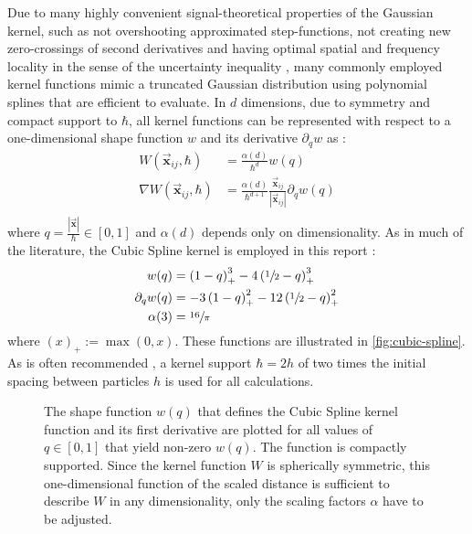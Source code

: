 \documentclass[oneside, a4paper]{book}
\newcommand\abs[1]{\left|#1\right|}
\newcommand\vek[1]{\vec{\bm{#1}}}
\newcommand\br[1]{\left(#1\right)}
\begin{document}
    Due to many highly convenient signal-theoretical properties of the Gaussian kernel, such as not overshooting approximated step-functions, not creating new zero-crossings of second derivatives and having optimal spatial and frequency locality in the sense of the uncertainty inequality \autocite{gauss-optimal}, many commonly employed kernel functions mimic a truncated Gaussian distribution using polynomial splines that are efficient to evaluate. In $d$ dimensions, due to symmetry and compact support to $\hbar$, all kernel functions can be represented with respect to a one-dimensional shape function $w$ and its derivative $\partial_q w$ as \autocite{band-phd}:
    \begin{align}\label{eq:kernel-definition}
      W(\vek{x}_{ij}, \hbar) &= \frac{\alpha(d)}{\hbar^d}w\br{q}\\
      \nabla W(\vek{x}_{ij}, \hbar) &= \frac{\alpha(d)}{\hbar^{d+1}}\frac{\vek{x}_{ij}}{\abs{\vek{x}_{ij}}} \partial_q w\br{q}\\
    \end{align}
    where $q = \frac{\abs{\vek{x}}}{\hbar} \in \left[0,1\right]$ and $\alpha(d)$ depends only on dimensionality. As in much of the literature, the Cubic Spline kernel is employed in this report \autocite{band-phd}:
    \begin{align}\label{eq:cubic-spline-form-func}
      w(q) &= \br{1-q}^3_+ - 4\br{\sfrac{1}{2}-q}^3_+\\
      \partial_q w(q) &= -3\br{1-q}^2_+ - 12\br{\sfrac{1}{2}-q}^2_+\\
      \alpha(3) &= \sfrac{16}{\pi}
    \end{align}
    where $(x)_+ := \max\br{0, x}$. These functions are illustrated in \autoref{fig:cubic-spline}. As is often recommended \autocite{tutorial2019}, a kernel support $\hbar=2h$ of two times the initial spacing between particles $h$ is used for all calculations.

    \begin{figure}
      \centering
      \caption{The shape function $w(q)$ that defines the Cubic Spline kernel function and its first derivative are plotted for all values of $q\in[0,1]$ that yield non-zero $w(q)$. The function is compactly supported. Since the kernel function $W$ is spherically symmetric, this one-dimensional function of the scaled distance is sufficient to describe $W$ in any dimensionality, only the scaling factors $\alpha$ have to be adjusted.}\label{fig:cubic-spline}
    \end{figure}
\end{document}
